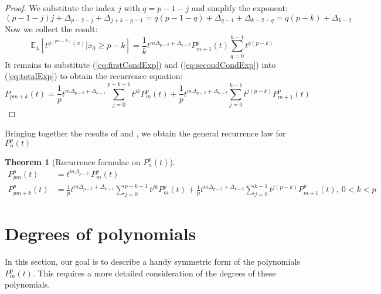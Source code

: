 \documentclass[a4paper]{article}
\theoremstyle{plain}
\newtheorem{theorem}{Theorem}[section]
\theoremstyle{definition}
\begin{document}
\begin{proof}
We substitute the index $j$ with $q = p-1-j$ and simplify the exponent:
$$  (p-1-j) j + \Delta_{p-2-j} + \Delta_{j+k-p-1} =
    q(p-1-q) + \Delta_{q-1} + \Delta_{k-2-q}=
   q(p-k)+\Delta_{k-2} 
$$   
Now we collect the result: 
\begin{equation}\label{eq:secondCondExp}
\mathbb{E}_\lambda\left[ t^{\phi^{(pm+k)}(x)}| x_0 \ge p-k \right] 
 =  \frac{1}{k} t^{m\Delta_{p-2} + \Delta_{k-2}} P_{m+1}^p(t)
  \sum\limits_{q=0}^{k-1} t^{q(p-k)}
  \end{equation}
It remains to substitute (\ref{eq:firstCondExp}) and (\ref{eq:secondCondExp}) into (\ref{eq:totalExp}) to obtain the recurrence equation:
$$P_{pm+k}(t)  =   \frac{1}{p} t^{m\Delta_{p-2} + \Delta_{k-1}}\sum\limits_{j=0}^{p-k-1} t^{jk} P_m^p(t) 
      + \frac{1}{p} t^{m\Delta_{p-2} + \Delta_{k-2}}\sum\limits_{j=0}^{k-1} t^{j(p-k)} P_{m+1}^p(t) $$
\end{proof}
Bringing together the results of  and , we obtain the general recurrence law for $P_{n}^p(t)$
\begin{theorem}[Recurrence formulae on $P_{n}^p(t)$] 
\begin{align}
\label{P_pm} P_{pm}^p(t) & =  t^{m\Delta_{p-2}}\ P_m^p(t) \\
\label{P_pm+k} P_{pm+k}^p(t) & =  \frac{1}{p} t^{m\Delta_{p-2} + \Delta_{k-1}}\sum\limits_{j=0}^{p-k-1} t^{jk} P_m^p(t)  + \frac{1}{p} t^{m\Delta_{p-2} + \Delta_{k-2}}\sum\limits_{j=0}^{k-1} t^{j(p-k)} P_{m+1}^p(t), \ 0 < k < p
 \end{align}
\end{theorem}


\section{Degrees of polynomials}\label{degrees}
In this section, our goal is to describe a handy symmetric form of the polynomials $P_m^p(t)$. This requires a more detailed consideration of the degrees of these polynomials.
\end{document}
